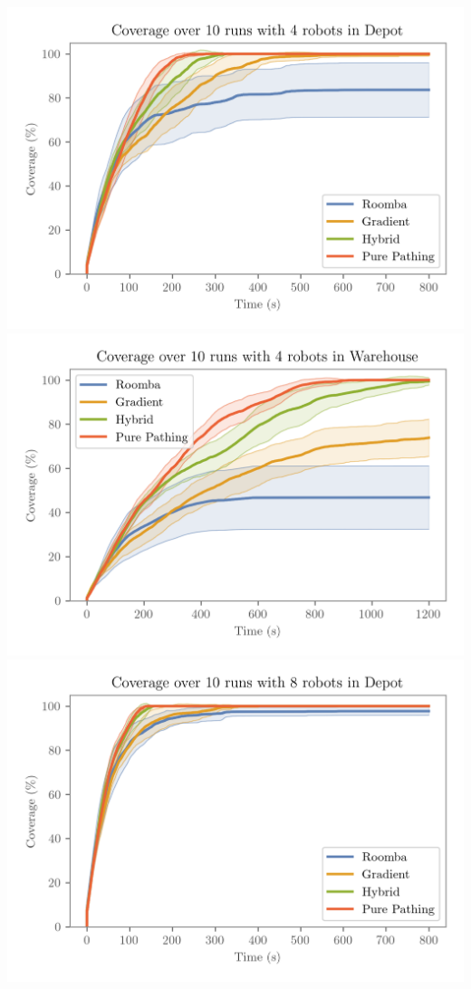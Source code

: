 \\
\includegraphics[width=\w]{figures/plots/benchmarks/coverage-over-10-runs-with-4-robots-in-depot.png}
\includegraphics[width=\w]{figures/plots/benchmarks/coverage-over-10-runs-with-4-robots-in-warehouse.png}
\\
\includegraphics[width=\w]{figures/plots/benchmarks/coverage-over-10-runs-with-8-robots-in-depot.png}
